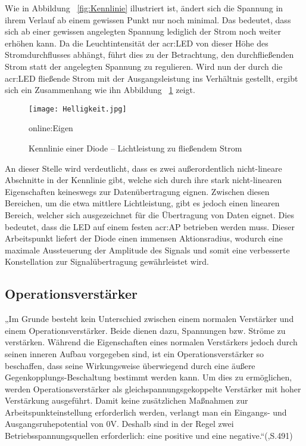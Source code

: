 Wie in Abbildung ~\ref{fig:Kennlinie} illustriert ist, ändert sich die Spannung in ihrem Verlauf ab einem gewissen Punkt nur noch minimal. Das bedeutet, dass sich ab einer gewissen angelegten Spannung lediglich der Strom noch weiter erhöhen kann. Da die Leuchtintensität der \gls{acr:LED} von dieser Höhe des Stromdurchflusses abhängt, führt dies zu der Betrachtung, den durchfließenden Strom statt der angelegten Spannung zu regulieren. Wird nun der durch die \gls{acr:LED} fließende Strom mit der Ausgangsleistung ins Verhältnis gestellt, ergibt sich ein Zusammenhang wie ihn Abbildung ~\ref{fig:Helligkeit} zeigt. 

\begin{figure}[H]
	\centering
	\texttt{[image: Helligkeit.jpg]}
	\caption[Kennlinie einer Diode – Lichtleistung zu fließendem Strom]{Kennlinie einer Diode – Lichtleistung zu fließendem Strom} 
	\gls{online:Eigen}
	\label{fig:Helligkeit}
\end{figure}

An dieser Stelle wird verdeutlicht, dass es zwei außerordentlich nicht-lineare Abschnitte in der Kennlinie gibt, welche sich durch ihre stark nicht-linearen Eigenschaften keineswegs zur Datenübertragung eignen. Zwischen diesen Bereichen, um die etwa mittlere Lichtleistung, gibt es jedoch einen linearen Bereich, welcher sich ausgezeichnet für die Übertragung von Daten eignet. Dies bedeutet, dass die LED auf einem festen \gls{acr:AP} betrieben werden muss. Dieser Arbeitspunkt liefert der Diode einen immensen Aktionsradius, wodurch eine maximale Aussteuerung der Amplitude des Signals und somit eine verbesserte Konstellation zur Signalübertragung gewährleistet wird. \cite{kavehradVisibleLightCommunication2019}


\subsection{Operationsverstärker}
\label{subsec:OP}

„Im Grunde besteht kein Unterschied zwischen einem normalen Verstärker und einem Operationsverstärker. Beide dienen dazu, Spannungen bzw. Ströme zu verstärken. Während die Eigenschaften eines normalen Verstärkers jedoch durch seinen inneren Aufbau vorgegeben sind, ist ein Operationsverstärker so beschaffen, dass seine Wirkungsweise überwiegend durch eine äußere Gegenkopplungs-Beschaltung bestimmt werden kann. Um dies zu ermöglichen, werden Operationsverstärker als gleichspannungsgekoppelte Verstärker mit hoher Verstärkung ausgeführt. Damit keine zusätzlichen Maßnahmen zur Arbeitspunkteinstellung erforderlich werden, verlangt man ein Eingangs- und Ausgangsruhepotential von 0V. Deshalb sind in der Regel zwei Betriebsspannungsquellen erforderlich: eine positive und eine negative.“(\cite{tietzeElectronicCircuits2008},S.491)

